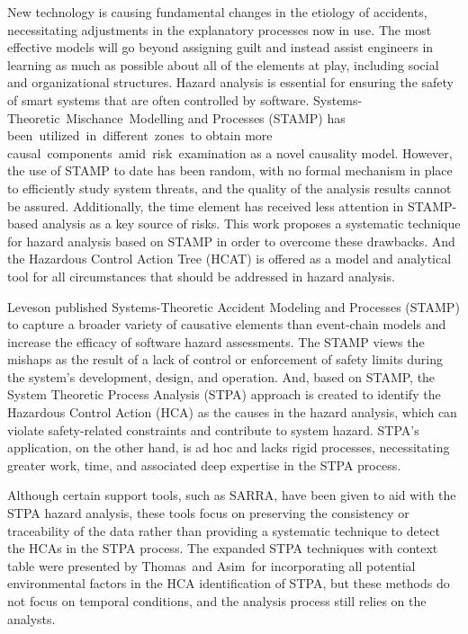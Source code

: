 \label{sec:question}
New technology is causing fundamental changes in the etiology of accidents, necessitating adjustments in the explanatory processes now in use. The most effective models will go beyond assigning guilt and instead assist engineers in learning as much as possible about all of the elements at play, including social and organizational structures. Hazard analysis is essential for ensuring the safety of smart systems that are often controlled by software. Systems-Theoretic Mischance Modelling and Processes (STAMP) has been utilized in different zones to obtain more causal components amid risk examination as a novel causality model. However, the use of STAMP to date has been random, with no formal mechanism in place to efficiently study system threats, and the quality of the analysis results cannot be assured. Additionally, the time element has received less attention in STAMP-based analysis as a key source of risks. This work proposes a systematic technique for hazard analysis based on STAMP in order to overcome these drawbacks. And the Hazardous Control Action Tree (HCAT) is offered as a model and analytical tool for all circumstances that should be addressed in hazard analysis. 


Leveson published Systems-Theoretic Accident Modeling and Processes (STAMP) to capture a broader variety of causative elements than event-chain models and increase the efficacy of software hazard assessments. The STAMP views the mishaps as the result of a lack of control or enforcement of safety limits during the system's development, design, and operation. And, based on STAMP, the System Theoretic Process Analysis (STPA) approach is created to identify the Hazardous Control Action (HCA) as the causes in the hazard analysis, which can violate safety-related constraints and contribute to system hazard. STPA's application, on the other hand, is ad hoc and lacks rigid processes, necessitating greater work, time, and associated deep expertise in the STPA process. 


Although certain support tools, such as SARRA, have been given to aid with the STPA hazard analysis, these tools focus on preserving the consistency or traceability of the data rather than providing a systematic technique to detect the HCAs in the STPA process. The expanded STPA techniques with context table were presented by Thomas and Asim for incorporating all potential environmental factors in the HCA identification of STPA, but these methods do not focus on temporal conditions, and the analysis process still relies on the analysts.


